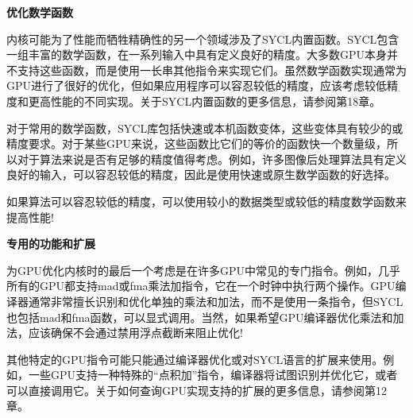 \hspace*{\fill} \par %
\textbf{优化数学函数}

内核可能为了性能而牺牲精确性的另一个领域涉及了SYCL内置函数。SYCL包含一组丰富的数学函数，在一系列输入中具有定义良好的精度。大多数GPU本身并不支持这些函数，而是使用一长串其他指令来实现它们。虽然数学函数实现通常为GPU进行了很好的优化，但如果应用程序可以容忍较低的精度，应该考虑较低精度和更高性能的不同实现。关于SYCL内置函数的更多信息，请参阅第18章。\par

对于常用的数学函数，SYCL库包括快速或本机函数变体，这些变体具有较少的或精度要求。对于某些GPU来说，这些函数比它们的等价的函数快一个数量级，所以对于算法来说是否有足够的精度值得考虑。例如，许多图像后处理算法具有定义良好的输入，可以容忍较低的精度，因此是使用快速或原生数学函数的好选择。\par

\begin{tcolorbox}[colback=red!5!white,colframe=red!75!black]
如果算法可以容忍较低的精度，可以使用较小的数据类型或较低的精度数学函数来提高性能!
\end{tcolorbox}

\hspace*{\fill} \par %
\textbf{专用的功能和扩展}

为GPU优化内核时的最后一个考虑是在许多GPU中常见的专门指令。例如，几乎所有的GPU都支持mad或fma乘法加指令，它在一个时钟中执行两个操作。GPU编译器通常非常擅长识别和优化单独的乘法和加法，而不是使用一条指令，但SYCL也包括mad和fma函数，可以显式调用。当然，如果希望GPU编译器优化乘法和加法，应该确保不会通过禁用浮点截断来阻止优化!\par

其他特定的GPU指令可能只能通过编译器优化或对SYCL语言的扩展来使用。例如，一些GPU支持一种特殊的“点积加”指令，编译器将试图识别并优化它，或者可以直接调用它。关于如何查询GPU实现支持的扩展的更多信息，请参阅第12章。\par







